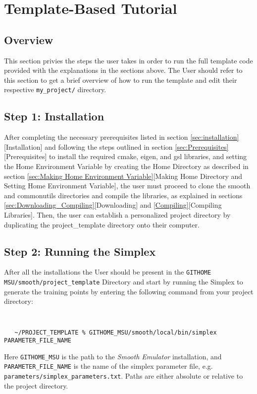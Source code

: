 \documentclass[main.tex]{subfiles}
\begin{document}
\setcounter{section}{7}
\section{Template-Based Tutorial}\label{sec:tutorial}

\subsection{Overview}
This section privies the steps the user takes in order to run the full template code provided with the explanations in the sections above. The User should refer to this section to get a brief overview of how to run the template and edit their respective {\tt my\_project/} directory.

\subsection{Step 1: Installation}
After completing the necessary prerequisites listed in section \ref{sec:installation}[Installation] and following the steps outlined in section \ref{sec:Prerequisites}[Prerequisites] to install the required cmake, eigen, and gsl libraries, and setting the Home Environment Variable by creating the Home Directory as described in section \ref{sec:Making Home Environment Variable}[Making Home Directory and Setting Home Environment Variable], the user must proceed to clone the smooth and commonutils directories and compile the libraries, as explained in sections \ref{sec:Downloading_Compiling}[Downloading] and \ref{Compiling}[Compiling Libraries]. Then, the user can establish a personalized project directory by duplicating the project\_template directory onto their computer.

\subsection{Step 2: Running the Simplex}

After all the installations the User should be present in the  {\tt GITHOME MSU/smooth/project\_template} Directory and start by running the Simplex to generate the training points by entering the following command from your project directory:
{\tt
\begin{verbatim}
   ~/PROJECT_TEMPLATE % GITHOME_MSU/smooth/local/bin/simplex PARAMETER_FILE_NAME
\end{verbatim}
}
Here {\tt GITHOME\_MSU} is the path to the {\it Smooth Emulator} installation, and {\tt PARAMETER\_FILE\_NAME} is the name of the simplex parameter file, e.g. {\tt parameters/simplex\_parameters.txt}. Paths are either absolute or relative to the project directory.
\end{document}
